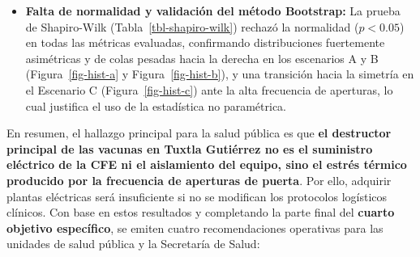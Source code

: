 \documentclass[
  spanish,
  us-letterpaper,
]{scrreprt}
\numberwithin{equation}{section}
\theoremstyle{plain}
\theoremstyle{plain}
\theoremstyle{plain}
\theoremstyle{definition}
\theoremstyle{remark}
\begin{document}
\begin{itemize}
  lineal sino exponencial, multiplicándose por más de cinco veces hasta
  alcanzar \textbf{1,905 dosis destruidas por año (2.57\%)} con un IC al
  \(95\%\) de \([1896, 1913]\text{ dosis}\) (\([2.56\%, 2.58\%]\),
  Tabla~\ref{tbl-riesgo-operativo-bootstrap}, Figura~\ref{fig-boot-c} y
  Figura~\ref{fig-box-boot-c}), produciendo un daño continuo durante
  todo el año sin importar la estación climática
  (Figura~\ref{fig-abanico-c}, Figura~\ref{fig-promedio-c},
  Figura~\ref{fig-mediana-c}, Figura~\ref{fig-hist-c} y
  Figura~\ref{fig-boxplot-c}).
\item
  \textbf{Falta de normalidad y validación del método Bootstrap:} La
  prueba de Shapiro-Wilk (Tabla~\ref{tbl-shapiro-wilk}) rechazó la
  normalidad (\(p < 0.05\)) en todas las métricas evaluadas, confirmando
  distribuciones fuertemente asimétricas y de colas pesadas hacia la
  derecha en los escenarios A y B (Figura~\ref{fig-hist-a} y
  Figura~\ref{fig-hist-b}), y una transición hacia la simetría en el
  Escenario C (Figura~\ref{fig-hist-c}) ante la alta frecuencia de
  aperturas, lo cual justifica el uso de la estadística no paramétrica.
\end{itemize}

En resumen, el hallazgo principal para la salud pública es que
\textbf{el destructor principal de las vacunas en Tuxtla Gutiérrez no es
el suministro eléctrico de la CFE ni el aislamiento del equipo, sino el
estrés térmico producido por la frecuencia de aperturas de puerta}. Por
ello, adquirir plantas eléctricas será insuficiente si no se modifican
los protocolos logísticos clínicos. Con base en estos resultados y
completando la parte final del \textbf{cuarto objetivo específico}, se
emiten cuatro recomendaciones operativas para las unidades de salud
pública y la Secretaría de Salud:
\end{document}
